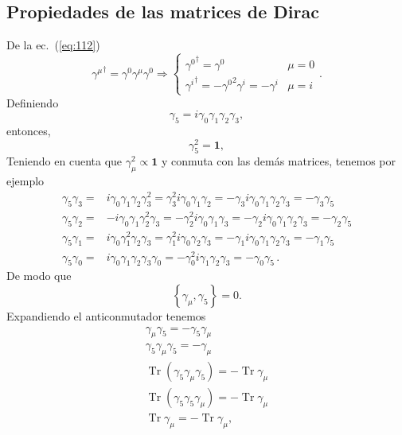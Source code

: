 \subsection{Propiedades de las matrices de Dirac}
\label{sec:propiedades-de-las}
De la ec.~(\ref{eq:112})
\begin{equation}
  {\gamma^\mu}^\dagger=\gamma^0\gamma^\mu\gamma^0\Rightarrow  
  \begin{cases}
    {\gamma^0}^\dagger=\gamma^0&\mu=0\\
    {\gamma^i}^\dagger=-{\gamma^0}^2\gamma^i=-\gamma^i&\mu=i
  \end{cases}.
\end{equation}
Definiendo
\begin{equation}
\label{eq:117}
  \gamma_5=i\gamma_0\gamma_1\gamma_2\gamma_3,
\end{equation}
entonces, 
\begin{equation}
  \gamma_5^2=\mathbf{1},
\end{equation}
Teniendo en cuenta que $\gamma_\mu^2\propto\mathbf{1}$ y conmuta con las dem\'as matrices, tenemos por ejemplo
\begin{align}
  \gamma_5\gamma_3=&i\gamma_0\gamma_1\gamma_2\gamma_3^2=\gamma_3^2i\gamma_0\gamma_1\gamma_2=-\gamma_3i\gamma_0\gamma_1\gamma_2\gamma_3=-\gamma_3\gamma_5\nonumber\\
  \gamma_5\gamma_2=&-i\gamma_0\gamma_1\gamma_2^2\gamma_3=-\gamma_2^2i\gamma_0\gamma_1\gamma_3=-\gamma_2i\gamma_0\gamma_1\gamma_2\gamma_3=-\gamma_2\gamma_5\nonumber\\
  \gamma_5\gamma_1=&i\gamma_0\gamma_1^2\gamma_2\gamma_3=\gamma_1^2i\gamma_0\gamma_2\gamma_3=-\gamma_1i\gamma_0\gamma_1\gamma_2\gamma_3=-\gamma_1\gamma_5\nonumber\\
  \gamma_5\gamma_0=&i\gamma_0\gamma_1\gamma_2\gamma_3\gamma_0=-\gamma_0^2i\gamma_1\gamma_2\gamma_3=-\gamma_0\gamma_5\,.
\end{align}
De modo que
\begin{equation}
  \label{eq:218}
  \left\{\gamma_\mu,\gamma_5\right\}=0. 
\end{equation}
Expandiendo el anticonmutador tenemos
\begin{align}
  \gamma_\mu\gamma_5=-\gamma_5\gamma_\mu\nonumber\\
  \gamma_5\gamma_\mu\gamma_5=-\gamma_\mu\nonumber\\
\operatorname{Tr}\left(\gamma_5\gamma_\mu\gamma_5\right)=-\operatorname{Tr}\gamma_\mu\nonumber\\
\operatorname{Tr}\left(\gamma_5\gamma_5\gamma_\mu\right)=-\operatorname{Tr}\gamma_\mu\nonumber\\
\operatorname{Tr}\gamma_\mu=-\operatorname{Tr}\gamma_\mu,
\end{align}
